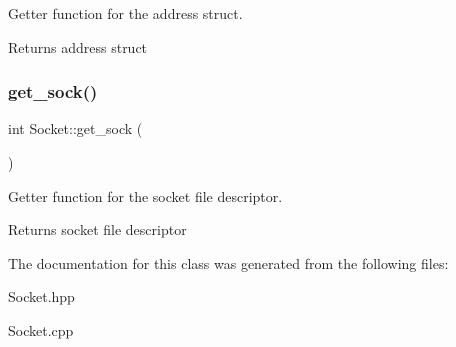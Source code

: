 Getter function for the address struct. 

\begin{DoxyReturn}{Returns}
address struct 
\end{DoxyReturn}
\mbox{\label{classSocket_a134a2436c9fff81048d7815eca284232}} 
\subsubsection{\texorpdfstring{get\+\_\+sock()}{get\_sock()}}
{\footnotesize\ttfamily int Socket\+::get\+\_\+sock (\begin{DoxyParamCaption}{ }\end{DoxyParamCaption})}



Getter function for the socket file descriptor. 

\begin{DoxyReturn}{Returns}
socket file descriptor 
\end{DoxyReturn}


The documentation for this class was generated from the following files\+:\begin{DoxyCompactItemize}
\item 
Socket.\+hpp\item 
Socket.\+cpp\end{DoxyCompactItemize}
